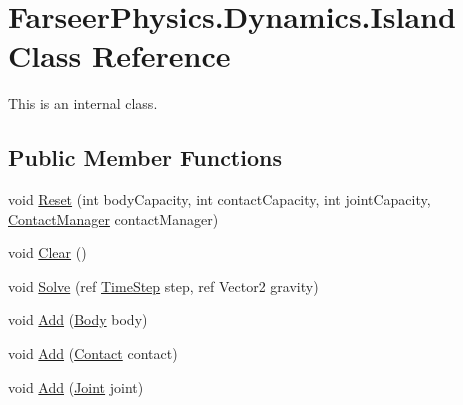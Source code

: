 \hypertarget{class_farseer_physics_1_1_dynamics_1_1_island}{\section{Farseer\+Physics.\+Dynamics.\+Island Class Reference}
\label{class_farseer_physics_1_1_dynamics_1_1_island}
}


This is an internal class.  


\subsection*{Public Member Functions}
\begin{DoxyCompactItemize}
\item 
void \hyperlink{class_farseer_physics_1_1_dynamics_1_1_island_a72cb34ddb958b06e71ee7179606bd6ba}{Reset} (int body\+Capacity, int contact\+Capacity, int joint\+Capacity, \hyperlink{class_farseer_physics_1_1_dynamics_1_1_contact_manager}{Contact\+Manager} contact\+Manager)
\item 
void \hyperlink{class_farseer_physics_1_1_dynamics_1_1_island_a122450bb6041ee15f2f2b8431dbb91b9}{Clear} ()
\item 
void \hyperlink{class_farseer_physics_1_1_dynamics_1_1_island_a1bab4cca5506d567b641fcb4387c1724}{Solve} (ref \hyperlink{struct_farseer_physics_1_1_dynamics_1_1_time_step}{Time\+Step} step, ref Vector2 gravity)
\item 
void \hyperlink{class_farseer_physics_1_1_dynamics_1_1_island_a5f077298b4467204772d4c34f470eef2}{Add} (\hyperlink{class_farseer_physics_1_1_dynamics_1_1_body}{Body} body)
\item 
void \hyperlink{class_farseer_physics_1_1_dynamics_1_1_island_adb65ae1438116df89a6b6532bae85747}{Add} (\hyperlink{class_farseer_physics_1_1_dynamics_1_1_contacts_1_1_contact}{Contact} contact)
\item 
void \hyperlink{class_farseer_physics_1_1_dynamics_1_1_island_ad376011c56f84f03e53d42c434320d81}{Add} (\hyperlink{class_farseer_physics_1_1_dynamics_1_1_joints_1_1_joint}{Joint} joint)
\end{DoxyCompactItemize}

